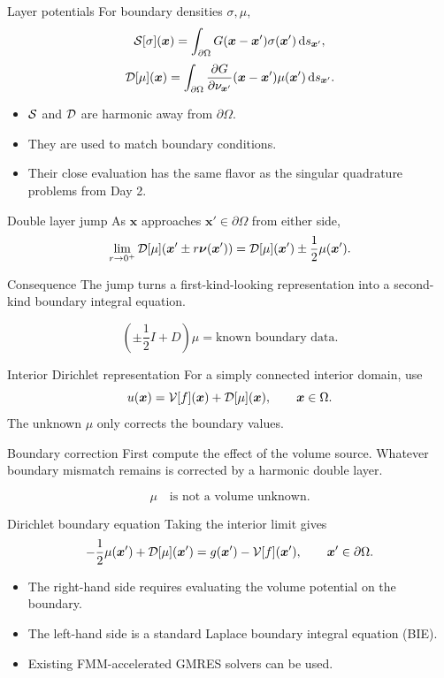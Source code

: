 \documentclass[aspectratio=169,11pt]{beamer}
\newcommand{\dd}{\,\mathrm d}
\newcommand{\x}{\bm{x}}
\newcommand{\xp}{\bm{x}'}
\newcommand{\nuvec}{\bm{\nu}}
\begin{document}
\begin{frame}{Layer potentials}
\small
For boundary densities $\sigma,\mu$,
\[
  \Sop[\sigma](\x)
  =
  \int_{\partial\Omega}G(\x-\xp)\sigma(\xp)\dd s_{\xp},
\]
\[
  \Dop[\mu](\x)
  =
  \int_{\partial\Omega}
  \frac{\partial G}{\partial \nu_{\xp}}(\x-\xp)
  \mu(\xp)\dd s_{\xp}.
\]

\begin{itemize}
  \item $\mathcal{S}$ and $\mathcal{D}$ are harmonic away from $\partial\Omega$.
  \item They are used to match boundary conditions.
  \item Their close evaluation has the same flavor as the singular quadrature
  problems from Day 2.
\end{itemize}
\end{frame}

\begin{frame}{Double layer jump}
\small
As $\x$ approaches $\xp\in\partial\Omega$ from either side,
\[
  \lim_{r\to 0^+}
  \Dop[\mu](\xp\pm r\nuvec(\xp))
  =
  \Dop[\mu](\xp)\pm \frac12\mu(\xp).
\]

\begin{block}{Consequence}
The jump turns a first-kind-looking representation into a second-kind boundary
integral equation.
\end{block}

\[
  \left(\pm\frac12 I + D\right)\mu = \text{known boundary data}.
\]
\end{frame}

\begin{frame}{Interior Dirichlet representation}
\small
For a simply connected interior domain, use
\[
  u(\x)=\Vop[f](\x)+\Dop[\mu](\x),\qquad \x\in\Omega.
\]
The unknown $\mu$ only corrects the boundary values.

\begin{block}{Boundary correction}
First compute the effect of the volume source. Whatever boundary mismatch
remains is corrected by a harmonic double layer.
\end{block}
\[
  \mu\quad\text{is not a volume unknown.}
\]
\end{frame}

\begin{frame}{Dirichlet boundary equation}
\small
Taking the interior limit gives
\[
  -\frac12\mu(\xp)+\Dop[\mu](\xp)
  =
  g(\xp)-\Vop[f](\xp),
  \qquad \xp\in\partial\Omega.
\]

\begin{itemize}
  \item The right-hand side requires evaluating the volume potential on the boundary.
  \item The left-hand side is a standard Laplace boundary integral equation (BIE).
  \item Existing FMM-accelerated GMRES solvers can be used.
\end{itemize}
\end{frame}
\end{document}
